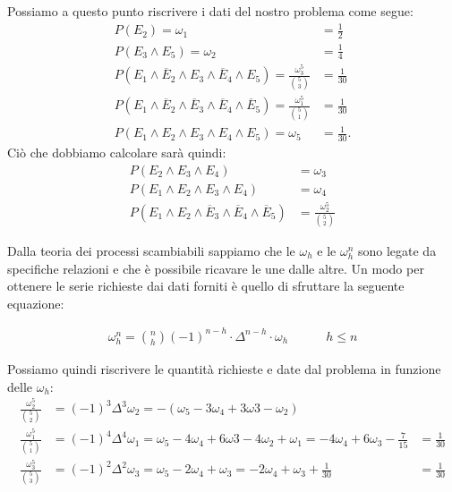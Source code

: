 Possiamo a questo punto riscrivere i dati del nostro problema come segue:
\begin{align*}
	P(E_{2})=\omega_{1}&=\frac{1}{2}\\
	 P(E_{3}\wedge E_{5}) =\omega_{2} &=\frac{1}{4}\\
	 P(E_{1}\wedge\overline{E}_{2}\wedge E_{3}\wedge\overline{E}_{4}\wedge E_{5}) =\frac{\omega_{3}^5}{\binom{5}{3}}&=\frac{1}{30} \\
	 P(E_{1}\wedge\overline{E}_{2}\wedge\overline{E}_{3}\wedge\overline{E}_{4}\wedge\overline{E}_{5}) =\frac{\omega_{1}^5}{\binom{5}{1}}&=\frac{1}{30} \\
	 P(E_{1}\wedge E_{2}\wedge E_{3}\wedge E_{4}\wedge E_{5}) =\omega_{5}&=\frac{1}{30}.
\end{align*}
Ciò che dobbiamo calcolare sarà quindi:
\begin{align*}
 P(E_{2}\wedge E_{3}\wedge E_{4})&=\omega_{3}\\
 P(E_{1}\wedge E_{2}\wedge E_{3}\wedge E_{4})&=\omega_{4}\\
 P(E_{1}\wedge E_{2}\wedge\overline{E}_{3}\wedge\overline{E}_{4}\wedge\overline{E}_{5})&=\frac{\omega_{2}^5}{\binom{5}{2}}
\end{align*}

Dalla teoria dei processi scambiabili sappiamo che le $\omega_h$ e le $\omega^n_h$ sono legate da specifiche relazioni e che è possibile ricavare le une dalle altre. Un modo per ottenere le serie richieste dai dati forniti è quello di sfruttare la seguente equazione:

\begin{align*}
    \omega_h^n = \binom{n}{h}(-1)^{n-h}\cdot\Delta^{n-h}\cdot\omega_h \quad \quad \quad  h\leq n
\end{align*}

Possiamo quindi riscrivere le quantità richieste e date dal problema  in funzione delle $\omega_h$:
\begin{align*}
    \frac{\omega_2^5}{\binom{5}{2}} &= (-1)^3\Delta^3\omega_2=-(\omega_5-3\omega_4+3\omega3-\omega_2)\\
    \frac{\omega_1^5}{\binom{5}{1}} &= (-1)^4\Delta^4\omega_1=\omega_5-4\omega_4+6\omega3-4\omega_2+\omega_1 =  -4\omega_4+6\omega_3-\frac{7}{15} &= \frac{1}{30} \\
    \frac{\omega_3^5}{\binom{5}{3}} &= (-1)^2\Delta^2\omega_3=\omega_5-2\omega_4+\omega_3=-2\omega_4+\omega_3+\frac{1}{30} &= \frac{1}{30} 
\end{align*}

